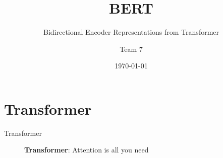 \documentclass[10pt]{beamer}
\title{BERT}
\subtitle{\textcolor{Primary}{B}idirectional \textcolor{Primary}{E}ncoder \textcolor{Primary}{R}epresentations from \textcolor{Primary}{T}ransformer}
\author{Team 7}
\date{\today}
\begin{document}
\maketitle

\maketoc

\section{Transformer}

\begin{frame}{Transformer}
  
  \begin{figure}
    \centering
    \caption{\textbf{Transformer}: Attention is all you need }
  \end{figure}

\end{frame}
\end{document}
